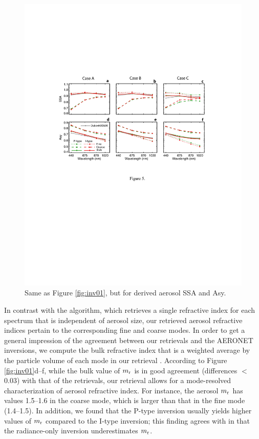 \begin{figure}[t]
  \centering
  \includegraphics[width={\textwidth}]{figures/inv04.pdf}
  \caption{Same as Figure \ref{fig:inv01}, but for derived aerosol SSA and Asy.}
  \label{fig:inv02}
\end{figure}

In contrast with the \Dub algorithm, which retrieves a single
refractive index for each spectrum that is independent of aerosol size, our
retrieved aerosol refractive indices pertain to the corresponding fine and
coarse modes. In order to get a general impression of the agreement between our
retrievals and the AERONET inversions, we compute the bulk refractive index
that is a weighted average by the particle volume of each mode in our retrieval
\citep[e.g.,][]{Wang07}. According to Figure \ref{fig:inv01}d--f, while the 
bulk value of $m_\text{r}$ is in good agreement (differences $<$ 0.03) with that of
the \Dub retrievals, our retrieval allows for a mode-resolved characterization
 of aerosol refractive index. For instance, the aerosol $m_\text{r}$ has values 
1.5--1.6 in the coarse mode, which is larger than that in the fine mode (1.4--1.5).
In addition, we found that the P-type inversion usually yields higher values of
$m_\text{r}$ compared to the I-type inversion; this finding agrees with \citet{Li09}
in that the radiance-only inversion underestimates $m_\text{r}$. 

